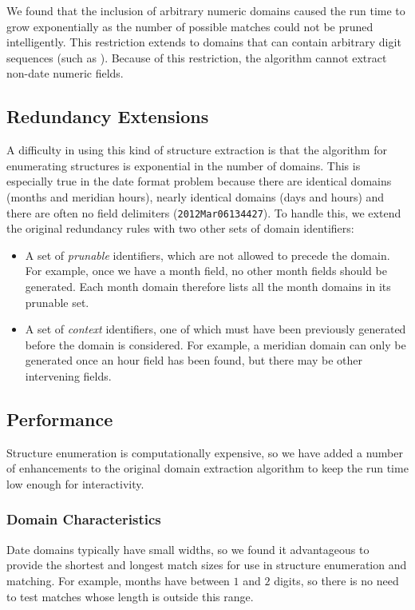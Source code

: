 We found that the inclusion of arbitrary numeric domains caused the run time to grow exponentially as the number of possible matches could not be pruned intelligently. 
This restriction extends to domains that can contain arbitrary digit sequences (such as ). Because of this restriction, the algorithm cannot extract non-date numeric fields.

\subsection{Redundancy Extensions} \label{subsec:mdl:redundancy}
A difficulty in using this kind of structure extraction is that the algorithm for enumerating structures is exponential in the number of domains. This is especially true in the date format problem because there are identical domains (\eg months and meridian hours), nearly identical domains (\eg days and hours) and there are often no field delimiters (\eg \texttt{2012Mar06134427}). To handle this, we extend the original redundancy rules with two other sets of domain identifiers:
\begin{itemize}
\setlength\itemsep{0em}
\item A set of \textit{prunable} identifiers, which are not allowed to precede the domain. For example, once we have a month field, no other month fields should be generated. Each month domain therefore lists all the month domains in its prunable set.
\item A set of \textit{context} identifiers, one of which must have been previously generated before the domain is considered. For example, a meridian domain can only be generated once an hour field has been found, but there may be other intervening fields.
\end{itemize}

\subsection{Performance}
Structure enumeration is computationally expensive, so we have added a number of enhancements to the original domain extraction algorithm to keep the run time low enough for interactivity.

\subsubsection{Domain Characteristics}
Date domains typically have small widths, so we found it advantageous to provide the shortest and longest match sizes for use in structure enumeration and matching. For example, months have between $1$ and $2$ digits, so there is no need to test matches whose length is outside this range.

